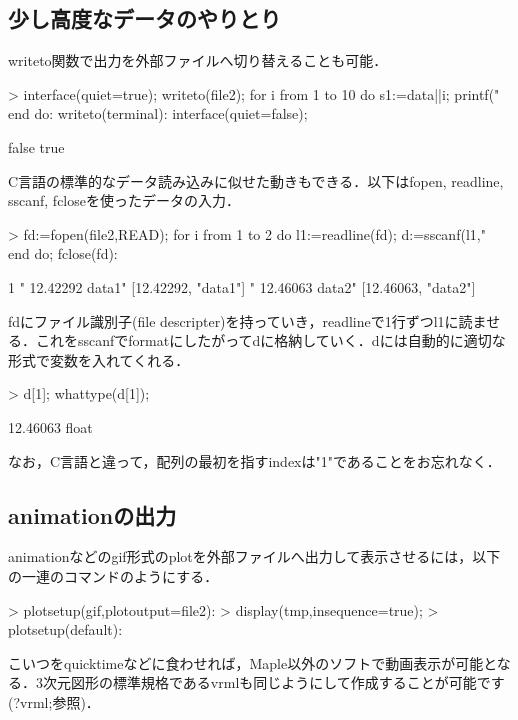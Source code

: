 \begin{MapleInput}
\subsection{少し高度なデータのやりとり}
writeto関数で出力を外部ファイルへ切り替えることも可能．
\begin{MapleInput}
> interface(quiet=true); 
  writeto(file2); 
  for i from 1 to 10 do 
    s1:=data||i;
    printf("%
  end do: 
  writeto(terminal):
  interface(quiet=false);
\end{MapleInput}
\begin{MapleError}
                                    false
                                     true
\end{MapleError}
C言語の標準的なデータ読み込みに似せた動きもできる．以下はfopen, readline, sscanf, fcloseを使ったデータの入力．
\begin{MapleInput}
> fd:=fopen(file2,READ); 
  for i from 1 to 2 do 
    l1:=readline(fd); 
    d:=sscanf(l1,"%
  end do; 
  fclose(fd):
\end{MapleInput}
\begin{MapleError}
                                      1
                              "  12.42292 data1"
                             [12.42292, "data1"]
                              "  12.46063 data2"
                             [12.46063, "data2"]
\end{MapleError}
fdにファイル識別子(file descripter)を持っていき，readlineで1行ずつl1に読ませる．これをsscanfでformatにしたがってdに格納していく．dには自動的に適切な形式で変数を入れてくれる．
\begin{MapleInput}
> d[1]; whattype(d[1]);
\end{MapleInput}
\begin{MapleError}
                                   12.46063
                                    float
\end{MapleError}
なお，C言語と違って，配列の最初を指すindexは"1"であることをお忘れなく．

\subsection{animationの出力}
animationなどのgif形式のplotを外部ファイルへ出力して表示させるには，以下の一連のコマンドのようにする．
\begin{MapleInput}
> plotsetup(gif,plotoutput=file2): 
> display(tmp,insequence=true);
> plotsetup(default):
\end{MapleInput}
こいつをquicktimeなどに食わせれば，Maple以外のソフトで動画表示が可能となる．3次元図形の標準規格であるvrmlも同じようにして作成することが可能です(?vrml;参照)．


\end{MapleInput}
